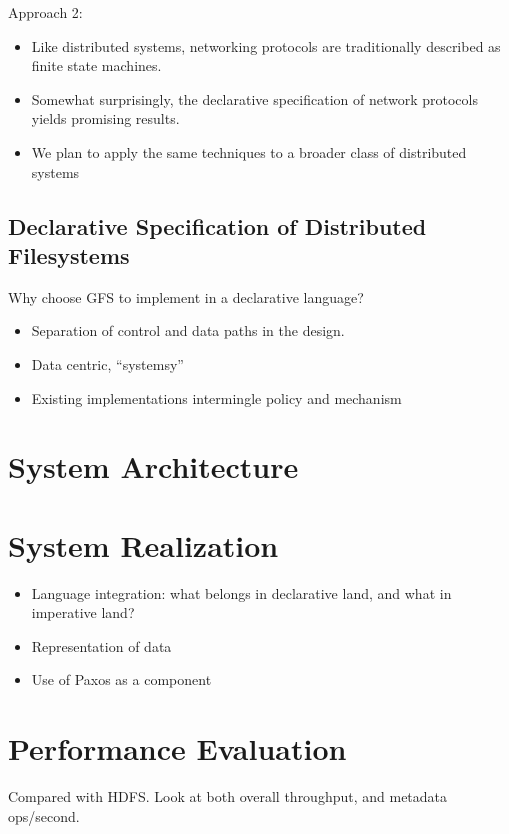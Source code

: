 \documentclass{article}
\begin{document}
Approach 2:
\begin{itemize}
\item
  Like distributed systems, networking protocols are traditionally
  described as finite state machines.

\item 
  Somewhat surprisingly, the declarative specification of network
  protocols yields promising results.

\item 
  We plan to apply the same techniques to a broader class of
  distributed systems
\end{itemize}

\subsection{Declarative Specification of Distributed Filesystems}
Why choose GFS to implement in a declarative language?
\begin{itemize}
\item
  Separation of control and data paths in the design.

\item
  Data centric, ``systemsy''

\item
  Existing implementations intermingle policy and mechanism
\end{itemize}

\section{System Architecture}

\section{System Realization}
\begin{itemize}
\item
  Language integration: what belongs in declarative land, and what in
  imperative land?

\item
  Representation of data

\item
  Use of Paxos as a component
\end{itemize}

\section{Performance Evaluation}
Compared with HDFS. Look at both overall throughput, and metadata ops/second.
\end{document}
